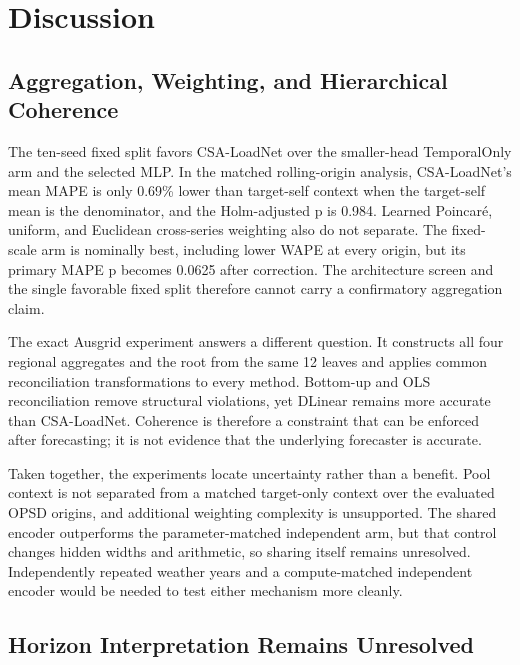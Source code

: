 \documentclass[electronics,article,submit,moreauthors]{Definitions/mdpi}
\begin{document}
\section{Discussion}\label{discussion}

\subsection{Aggregation, Weighting, and Hierarchical Coherence}\label{aggregation-weighting-and-hierarchical-coherence}

The ten-seed fixed split favors CSA-LoadNet over the smaller-head TemporalOnly arm and the selected MLP. In the matched rolling-origin analysis, CSA-LoadNet's mean MAPE is only 0.69\% lower than target-self context when the target-self mean is the denominator, and the Holm-adjusted p is 0.984. Learned Poincar\'{e}, uniform, and Euclidean cross-series weighting also do not separate. The fixed-scale arm is nominally best, including lower WAPE at every origin, but its primary MAPE p becomes 0.0625 after correction. The architecture screen and the single favorable fixed split therefore cannot carry a confirmatory aggregation claim.

The exact Ausgrid experiment answers a different question. It constructs all four regional aggregates and the root from the same 12 leaves and applies common reconciliation transformations to every method. Bottom-up and OLS reconciliation remove structural violations, yet DLinear remains more accurate than CSA-LoadNet. Coherence is therefore a constraint that can be enforced after forecasting; it is not evidence that the underlying forecaster is accurate.

Taken together, the experiments locate uncertainty rather than a benefit. Pool context is not separated from a matched target-only context over the evaluated OPSD origins, and additional weighting complexity is unsupported. The shared encoder outperforms the parameter-matched independent arm, but that control changes hidden widths and arithmetic, so sharing itself remains unresolved. Independently repeated weather years and a compute-matched independent encoder would be needed to test either mechanism more cleanly.

\subsection{Horizon Interpretation Remains Unresolved}\label{horizon-interpretation-remains-unresolved}
\end{document}
